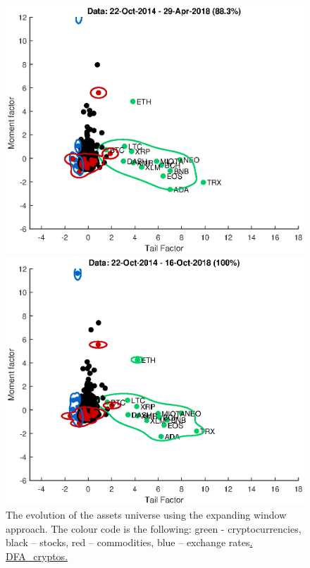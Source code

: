 \begin{figure}[H]
	\begin{minipage}[b]{0.55\textwidth}
	\centering
	\includegraphics[width=1\textwidth]{Fig/figure_10c}
	
\end{minipage}
\begin{minipage}[b]{0.55\textwidth}
	\centering
	\includegraphics[width=1\textwidth]{Fig/figure_10d}
	
\end{minipage}
	\caption{The evolution of the assets universe using the expanding window approach. The colour code is the following: green - cryptocurrencies, black – stocks, red – commodities, blue – exchange rates\href{https://github.com/QuantLet/Genus_proximum_cryptos/tree/master/DFA_Cryptos}{. DFA\_cryptos.}}
	\label{fig:figure_10}
\end{figure}

